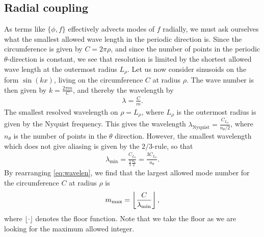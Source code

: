 \subsection{Radial coupling}
%
As terms like $\{\phi, f\}$ effectively advects modes of $f$ radially, we must ask ourselves what the smallest allowed wave length in the periodic direction is.
Since the circumference is given by $C=2\pi\rho$, and since the number of points in the periodic $\theta$-direction is constant, we see that resolution is limited by the shortest allowed wave length at the outermost radius $L_\rho$.
Let us now consider sinusoids on the form $\sin(kx)$, living on the circumference $C$ at radius $\rho$.
The wave number is then given by $k=\frac{2\pi m}{C}$, and thereby the wavelength by
%
\begin{align}
    \lambda = \frac{C}{m}.
    \label{eq:wavelen}
\end{align}
%
The smallest resolved wavelength on $\rho=L_\rho$, where $L_\rho$ is the outermost radius is given by the Nyquist frequency.
This gives the wavelength $\lambda_{\text{Nyquist}} = \frac{C_{L_\rho}}{n_\theta/2}$, where $n_\theta$ is the number of points in the $\theta$ direction.
However, the smallest wavelength which does not give aliasing is given by the $2/3$-rule, so that
%
\begin{align*}
    \lambda_\min = \frac{C_{L_\rho}}{\frac{2}{3}\frac{n_\theta}{2}} = \frac{3C_{L_\rho}}{n_\theta}.
\end{align*}
%
By rearranging \cref{eq:wavelen}, we find that the largest allowed mode number for the circumference $C$ at radius $\rho$ is
%
\begin{align*}
    m_{\text{max}} = \left\lfloor \frac{C}{\lambda_{\text{min}}}\right\rfloor,
\end{align*}
%
where $\lfloor \cdot \rfloor$ denotes the floor function.
Note that we take the floor as we are looking for the maximum allowed integer.
